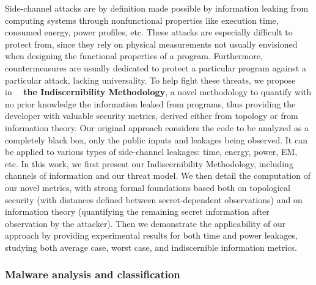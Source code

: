 Side-channel attacks are  by definition made possible by information leaking from computing systems through nonfunctional properties like execution time, consumed energy, power profiles, etc. These attacks are especially difficult to protect from, since they rely on physical measurements not usually envisioned when designing the functional properties of a program. Furthermore, countermeasures are usually dedicated to protect a particular program against a particular attack, lacking universality. To help fight these threats, we propose in~\cite{marquer:hal-03793085}~ \textbf{the Indiscernibility Methodology}, a novel methodology to quantify with no prior knowledge the information leaked from programs, thus providing the developer with valuable security metrics, derived either from topology or from information theory. Our original approach considers the code to be analyzed as a completely black box, only the public inputs and leakages being observed. It can be applied to various types of side-channel leakages: time, energy, power, EM, etc. In this work, we first present our Indiscernibility Methodology, including channels of information and our threat model. We then detail the computation of our novel metrics, with strong formal foundations based both on topological security (with distances defined between secret-dependent observations) and on information theory (quantifying the remaining secret information after observation by the attacker). Then we demonstrate the applicability of our approach by providing experimental results for both time and power leakages, studying both average case, worst case, and indiscernible information metrics.


\subsubsection{Malware analysis and classification}


